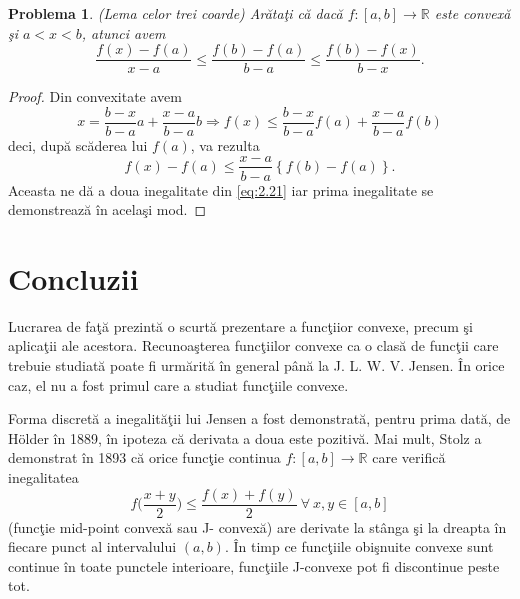 \documentclass[a4paper,12pt,oneside]{report}
\newtheorem{problem}{Problema}
\begin{document}
\begin{problem} (Lema celor trei coarde)
Ar\u{a}ta\c{t}i c\u{a} dac\u{a} \(f : \left [ a,b \right ]  \to \mathbb{R}\) este convex\u{a} \c{s}i \(a <  x < b\), atunci avem
\begin{displaymath}
    \frac{f\left ( x \right ) - f\left ( a \right )}{x - a} \leq \frac{f\left ( b \right ) - f\left ( a \right )}{b - a} \leq  \frac{f\left ( b \right ) - f\left ( x \right )}{b - x}.   \label{eq:2.21}\tag{2.21}
\end{displaymath}
\end{problem}
\begin{proof}
Din convexitate avem
\begin{displaymath}
    x = \frac{b - x}{b - a}a + \frac{x - a}{b - a }b \Rightarrow f\left ( x \right ) \leq \frac{b - x}{b - a}f\left ( a \right ) + \frac{x - a}{b - a }f\left ( b \right )
\end{displaymath}
 deci, dup\u{a} sc\u{a}derea lui \(f\left ( a \right )\), va rezulta
 \begin{displaymath}
     f\left ( x \right ) - f\left ( a \right )\leq \frac{x - a}{b - a }\left \{ f\left ( b \right ) - f\left ( a \right ) \right \}. \label{eq:2.22} \tag{2.22}
 \end{displaymath}
Aceasta ne d\u{a} a doua inegalitate din \ref{eq:2.21} iar prima inegalitate se demonstreaz\u{a} \^{i}n acela\c{s}i mod.
\end{proof}

\chapter* {Concluzii}

Lucrarea de fa\c{t}\u{a} prezint\u{a} o scurt\u{a} prezentare a func\c{t}iior convexe, precum \c{s}i aplica\c{t}ii ale acestora.  Recunoa\c{s}terea func\c{t}iilor convexe ca o clas\u{a} de func\c{t}ii care trebuie studiat\u{a} poate fi urm\u{a}rit\u{a} \^{i}n general p\^{a}n\u{a} la  J. L. W. V. Jensen.  \^{I}n orice caz, el nu a fost primul care a studiat funcţiile convexe.

 Forma discret\u{a} a inegalit\u{a}\c{t}ii lui Jensen a fost demonstrat\u{a},  pentru prima dat\u{a},  de Hölder \^{i}n 1889, \^{i}n  ipoteza c\u{a} derivata a doua este pozitiv\u{a}. Mai mult, Stolz a demonstrat \^{i}n 1893 c\u{a} orice func\c{t}ie continua \(f : \left [ a,b \right ] \rightarrow \mathbb{R}\) care verific\u{a} inegalitatea 
 \[
 f\Big(\frac{x+y}{2}\Big)\leq \frac{f(x)+f(y)}{2}~\forall~x, y\in [a, b]
 \]
 (func\c{t}ie mid-point convex\u{a} sau J- convex\u{a})
 are derivate la st\^{a}nga \c{s}i la dreapta \^{i}n fiecare punct al intervalului \(\left ( a,b \right )\). \^{I}n timp ce func\c{t}iile obi\c{s}nuite convexe sunt continue \^{i}n toate punctele interioare,  func\c{t}iile J-convexe pot fi discontinue peste tot.
\end{document}
